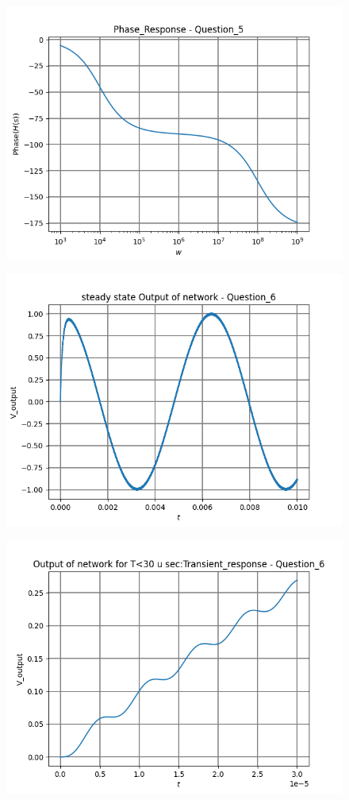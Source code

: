 \documentclass[11pt, a4paper]{article}
\begin{document}
\begin{figure}[!tbh]
   	\centering
   	\includegraphics[scale=0.5]{figure6.png}
   	\label{fig:32}
   \end{figure}
\begin{figure}[!tbh]
   	\centering
   	\includegraphics[scale=0.5]{figure7.png}
   	\label{fig:32}
   \end{figure}
\begin{figure}[!tbh]
   	\centering
   	\includegraphics[scale=0.5]{figure8.png}
   	\label{fig:32}
   \end{figure}
\end{document}
